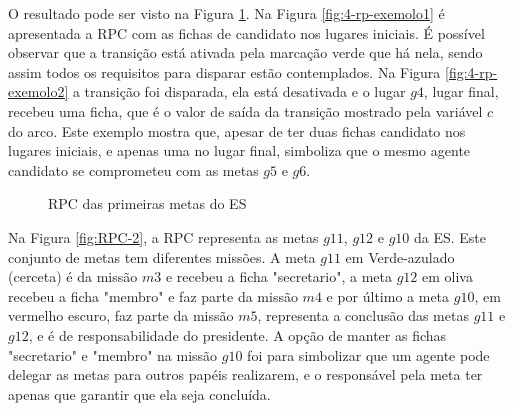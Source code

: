 O resultado pode ser visto na Figura \ref{fig:RPC-1}. Na Figura \ref{fig:4-rp-exemolo1} é apresentada a RPC com as fichas de candidato nos lugares iniciais. É possível observar que a transição está ativada pela marcação verde que há nela, sendo assim todos os requisitos para disparar estão contemplados. Na Figura \ref{fig:4-rp-exemolo2} a transição foi disparada, ela está desativada e o lugar $g4$, lugar final, recebeu uma ficha, que é o valor de saída da transição mostrado pela variável $c$ do arco. Este exemplo mostra que, apesar de ter duas fichas candidato nos lugares iniciais, e apenas uma no lugar final, simboliza que o mesmo agente candidato se comprometeu com as metas $g5$ e $g6$.

\begin{figure}[ht]
  \centering
  \caption{RPC das primeiras metas do ES}
  \label{fig:RPC-1}
\end{figure}

Na Figura \ref{fig:RPC-2}, a RPC representa as metas $g11$, $g12$ e $g10$ da ES. Este conjunto de metas tem diferentes missões. A meta $g11$ em Verde-azulado (cerceta) é da missão $m3$ e recebeu a ficha "secretario", a meta $g12$ em oliva recebeu a ficha "membro" e faz parte da missão $m4$ e por último a meta $g10$, em vermelho escuro, faz parte da missão $m5$, representa a conclusão das metas $g11$ e $g12$, e é de responsabilidade do presidente. A opção de manter as fichas "secretario" e "membro" na missão $g10$ foi para simbolizar que um agente pode delegar as metas para outros papéis realizarem, e o responsável pela meta ter apenas que garantir que ela seja concluída.


